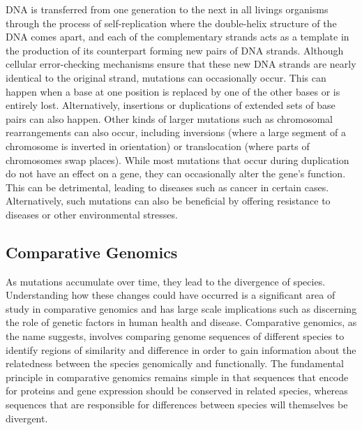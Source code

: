 DNA is transferred from one generation to the next in all livings organisms through the process of self-replication where the double-helix structure of the DNA comes apart, and each of the complementary strands acts as a template in the production of its counterpart forming new pairs of DNA strands\cite{pray2008semi}. Although cellular error-checking mechanisms ensure that these new DNA strands are nearly identical to the original strand, mutations can occasionally occur. This can happen when a base at one position is replaced by one of the other bases or is entirely lost. Alternatively, insertions or duplications of extended sets of base pairs can also happen. Other kinds of larger mutations such as chromosomal rearrangements can also occur, including inversions (where a large segment of a chromosome is inverted in orientation) or translocation (where parts of chromosomes swap places)\cite{hartwell2008genetics}. While most mutations that occur during duplication do not have an effect on a gene, they can occasionally alter the gene's function. This can be detrimental, leading to diseases such as cancer in certain cases. Alternatively, such mutations can also be beneficial by offering resistance to diseases or other environmental stresses. 

\subsection{Comparative Genomics}\label{comparegenomics}

As mutations accumulate over time, they lead to the divergence of species. Understanding how these changes could have occurred is a significant area of study in comparative genomics and has large scale implications such as discerning the role of genetic factors in human health and disease\cite{collins2003vision}. Comparative genomics, as the name suggests, involves comparing genome sequences of different species to identify regions of similarity and difference in order to gain information about the relatedness between the species genomically and functionally. The fundamental principle in comparative genomics remains simple in that sequences that encode for proteins and gene expression should be conserved in related species, whereas sequences that are responsible for differences between species will themselves be divergent\cite{hardison2003comparative}.

